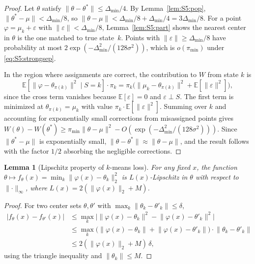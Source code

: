 \documentclass[twoside]{article}
\theoremstyle{plain}
\newtheorem{lemma}[theorem]{Lemma}
\theoremstyle{definition}
\theoremstyle{remark}
\newcommand{\E}{\mathbb{E}}
\newcommand{\1}{\mathbf{1}}
\renewcommand{\phi}{\varphi}
\newcommand{\muk}{\mu_k}
\newcommand{\norm}[1]{\lVert#1\rVert}
\begin{document}
\begin{proof}
Let $\theta$ satisfy $\norm{\theta-\theta^*}\le\Delta_{\min}/4$.  By
Lemma~\ref{lem:S5:pop}, $\norm{\theta^*-\mu}<\Delta_{\min}/8$, so
$\norm{\theta-\mu}<\Delta_{\min}/8+\Delta_{\min}/4=3\Delta_{\min}/8$.
For a point $\phi=\muk+\varepsilon$ with $\norm{\varepsilon}<\Delta_{\min}/8$,
Lemma~\ref{lem:S5:part} shows the nearest center in $\theta$ is the one
matched to true state~$k$.  Points with $\norm{\varepsilon}\ge\Delta_{\min}/8$
have probability at most $2\exp(-\Delta_{\min}^2/(128\sigma^2))$, which is
$o(\pi_{\min})$ under \eqref{eq:S5:strongsep}.

In the region where assignments are correct, the contribution to $W$ from
state $k$ is
\[
\E[\norm{\phi-\theta_{\pi(k)}}^2\mid S=k]\cdot\pi_k
= \pi_k\bigl(\norm{\muk-\theta_{\pi(k)}}^2+\E[\norm{\varepsilon}^2]\bigr),
\]
since the cross term vanishes because $\E[\varepsilon]=0$ and
$\varepsilon\perp S$.  The first term is minimized at
$\theta_{\pi(k)}=\muk$ with value $\pi_k\cdot\E[\norm{\varepsilon}^2]$.
Summing over $k$ and accounting for exponentially small corrections from
misassigned points gives
$W(\theta)-W(\theta^*)\ge\pi_{\min}\norm{\theta-\mu}^2
 - O(\exp(-\Delta_{\min}^2/(128\sigma^2)))$.
Since $\norm{\theta^*-\mu}$ is exponentially small,
$\norm{\theta-\theta^*}\approx\norm{\theta-\mu}$, and the result
follows with the factor $1/2$ absorbing the negligible corrections.
\end{proof}

\begin{lemma}[Lipschitz property of $k$-means loss]
\label{lem:S5:lipschitz}
For any fixed $x$, the function
$\theta\mapsto f_\theta(x)=\min_k\norm{\phi(x)-\theta_k}_2^2$ is
$L(x)$-Lipschitz in $\theta$ with respect to $\norm{\cdot}_\infty$,
where $L(x)=2(\norm{\phi(x)}_2+M)$.
\end{lemma}

\begin{proof}
For two center sets $\theta,\theta'$ with
$\max_k\norm{\theta_k-\theta'_k}\le\delta$,
\begin{align*}
|f_\theta(x)-f_{\theta'}(x)|
&\le \max_k\bigl|\norm{\phi(x)-\theta_k}^2
            -\norm{\phi(x)-\theta'_k}^2\bigr| \\
&\le \max_k\bigl(\norm{\phi(x)-\theta_k}+\norm{\phi(x)-\theta'_k}\bigr)
    \cdot\norm{\theta_k-\theta'_k} \\
&\le 2(\norm{\phi(x)}_2+M)\,\delta,
\end{align*}
using the triangle inequality and $\norm{\theta_k}\le M$.
\end{proof}
\end{document}
